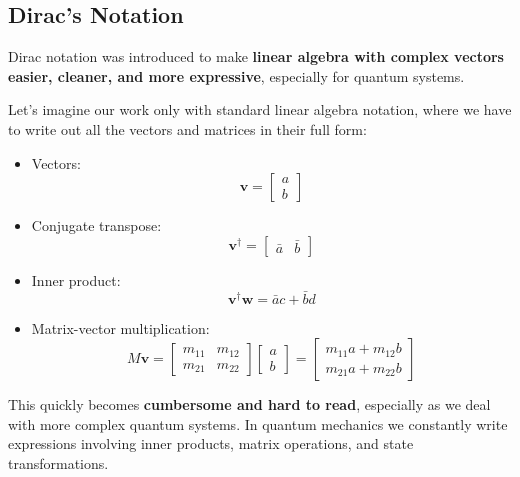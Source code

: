 \subsection{Dirac's Notation}

Dirac notation was introduced to make \textbf{linear algebra with complex vectors easier, cleaner, and more expressive}, especially for quantum systems.

\highspace
Let's imagine our work only with standard linear algebra notation, where we have to write out all the vectors and matrices in their full form:
\begin{itemize}
    \item Vectors:
    \begin{equation*}
        \mathbf{v} = \begin{bmatrix}
            a \\ b
        \end{bmatrix}
    \end{equation*}
    \item Conjugate transpose:
    \begin{equation*}
        \mathbf{v}^{\dagger} = \begin{bmatrix}
            \bar{a} & \bar{b}
        \end{bmatrix}
    \end{equation*}
    \item Inner product:
    \begin{equation*}
        \mathbf{v}^{\dagger} \mathbf{w} = \bar{a}c + \bar{b}d
    \end{equation*}
    \item Matrix-vector multiplication:
    \begin{equation*}
        M \mathbf{v} = \begin{bmatrix}
            m_{11} & m_{12} \\ m_{21} & m_{22}
        \end{bmatrix}
        \begin{bmatrix}
            a \\ b
        \end{bmatrix}
        =
        \begin{bmatrix}
            m_{11}a + m_{12}b \\ m_{21}a + m_{22}b
        \end{bmatrix}
    \end{equation*}
\end{itemize}
This quickly becomes \textbf{cumbersome and hard to read}, especially as we deal with more complex quantum systems. In quantum mechanics we constantly write expressions involving inner products, matrix operations, and state transformations.

